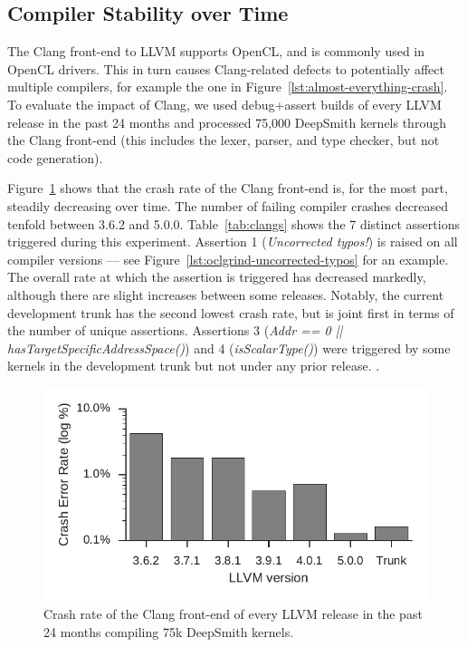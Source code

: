 \subsection{Compiler Stability over Time}%
\label{subsec:clangs}

 The Clang front-end to LLVM supports OpenCL, and is commonly used in OpenCL drivers. This in turn causes Clang-related defects to potentially affect multiple compilers, for example the one in Figure~\ref{lst:almost-everything-crash}. To evaluate the impact of Clang, we used debug+assert builds of every LLVM release in the past 24 months and processed 75,000 DeepSmith kernels through the Clang front-end (this includes the lexer, parser, and type checker, but not code generation).

Figure~\ref{fig:clangs} shows that the crash rate of the Clang front-end is, for the most part, steadily decreasing over time. The number of failing compiler crashes decreased tenfold between 3.6.2 and 5.0.0.
Table~\ref{tab:clangs} shows the 7 distinct assertions triggered during this experiment. Assertion 1 (\emph{Uncorrected typos!}) is raised on all compiler versions --- see Figure~\ref{lst:oclgrind-uncorrected-typos} for an example. The overall rate at which the assertion is triggered has decreased markedly, although there are slight increases between some releases. Notably, the current development trunk has the second lowest crash rate, but is joint first in terms of the number of unique assertions. Assertions 3 (\emph{Addr == 0 || hasTargetSpecificAddressSpace()}) and 4 (\emph{isScalarType()}) were triggered by some kernels in the development trunk but not under any prior release. .

\begin{figure}
  \centering %
  \includegraphics[width=.95\columnwidth]{build/img/clang-crashes}%
  \caption{%
    Crash rate of the Clang front-end of every LLVM release in the past 24 months compiling 75k DeepSmith kernels.
  }%
  \label{fig:clangs} %
\end{figure}

